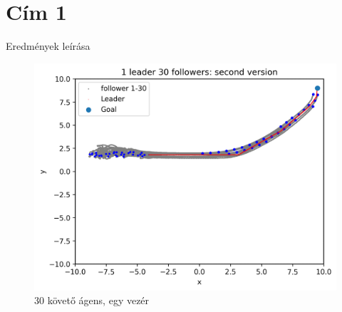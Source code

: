 \section{Cím 1}

Eredmények leírása

\begin{figure}[h]
    \centering
    \includegraphics[scale=0.8]{figures/images/results/swarm_second_version.png}
    \caption{30 követő ágens, egy vezér}
    \label{fig:result_30_foll_1_lead}
\end{figure}



